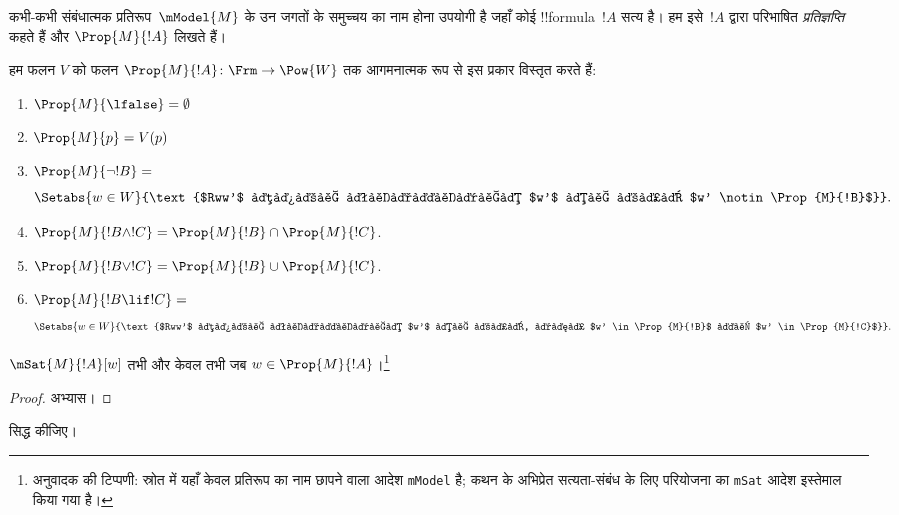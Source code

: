 \documentclass[../../../include/open-logic-section]{subfiles}
\begin{document}


कभी-कभी संबंधात्मक प्रतिरूप~$\mModel{M}$ के उन जगतों के समुच्चय का नाम
होना उपयोगी है जहाँ कोई !!{formula}~$!A$ सत्य है। हम इसे~$!A$ द्वारा परिभाषित
\emph{प्रतिज्ञप्ति} कहते हैं और $\Prop{M}{!A}$ लिखते हैं।

\begin{defn}
  हम फलन $V$ को फलन $\Prop{M}{!A} \colon \Frm \to \Pow{W}$ तक
  आगमनात्मक रूप से इस प्रकार विस्तृत करते हैं:
  \begin{enumerate}
  \item $\Prop{M}{\lfalse} = \emptyset$
  \item $\Prop{M}{p} = V(p)$
  \item $\Prop{M}{\lnot !B} = {}$
    \[
      \Setabs{w \in W}{\text{$Rww'$ वाले प्रत्येक $w'$ के लिए $w'
          \notin \Prop{M}{!B}$}}.
    \]
  \item $\Prop{M}{!B \land !C} = \Prop{M}{!B} \cap \Prop{M}{!C}$.
  \item $\Prop{M}{!B \lor !C} = \Prop{M}{!B} \cup \Prop{M}{!C}$.
  \item $\Prop{M}{!B \lif !C} = {}$
    \[
      \Setabs{w \in W}{\text{$Rww'$ वाले प्रत्येक $w'$ के लिए, यदि $w'
          \in \Prop{M}{!B}$ तो $w' \in \Prop{M}{!C}$}}.
    \]
  \end{enumerate}
\end{defn}

\begin{prop}
  $\mSat{M}{!A}[w]$ तभी और केवल तभी जब $w \in \Prop{M}{!A}$।\footnote{अनुवादक की
  टिप्पणी: स्रोत में यहाँ केवल प्रतिरूप का नाम छापने वाला आदेश
  \texttt{mModel} है; कथन के अभिप्रेत सत्यता-संबंध के लिए परियोजना का
  \texttt{mSat} आदेश इस्तेमाल किया गया है।}
\end{prop}

\begin{proof}
  अभ्यास।
\end{proof}

\begin{prob}
   सिद्ध कीजिए।
\end{prob}
\end{document}
